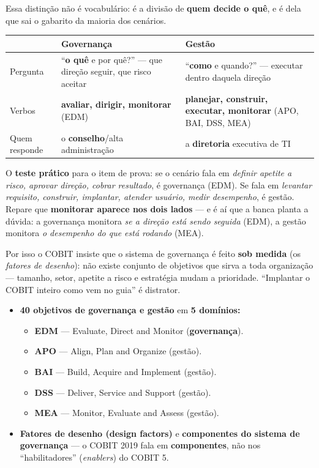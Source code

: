\begin{conceito}
Essa distinção não é vocabulário: é a divisão de \textbf{quem decide o quê},
e é dela que sai o gabarito da maioria dos cenários.

\begin{center}
\begin{tabular}{@{}p{2.4cm}p{4.3cm}p{4.6cm}@{}}
\toprule
& \textbf{Governança} & \textbf{Gestão} \\
\midrule
Pergunta & ``\textbf{o quê} e por quê?'' --- que direção seguir, que risco
aceitar & ``\textbf{como} e quando?'' --- executar dentro daquela direção \\
Verbos & \textbf{avaliar, dirigir, monitorar} (EDM) & \textbf{planejar,
construir, executar, monitorar} (APO, BAI, DSS, MEA) \\
Quem responde & o \textbf{conselho}/alta administração & a \textbf{diretoria}
executiva de TI \\
\bottomrule
\end{tabular}
\end{center}

O \textbf{teste prático} para o item de prova: se o cenário fala em
\emph{definir apetite a risco, aprovar direção, cobrar resultado}, é
governança (EDM). Se fala em \emph{levantar requisito, construir, implantar,
atender usuário, medir desempenho}, é gestão. Repare que \textbf{monitorar
aparece nos dois lados} --- e é aí que a banca planta a dúvida: a governança
monitora \emph{se a direção está sendo seguida} (EDM), a gestão monitora
\emph{o desempenho do que está rodando} (MEA).

Por isso o COBIT insiste que o sistema de governança é feito \textbf{sob
medida} (os \emph{fatores de desenho}): não existe conjunto de objetivos que
sirva a toda organização --- tamanho, setor, apetite a risco e estratégia
mudam a prioridade. ``Implantar o COBIT inteiro como vem no guia'' é distrator.
\end{conceito}

\begin{itemize}
\item \textbf{40 objetivos de governança e gestão} em \textbf{5 domínios:}
\begin{itemize}
\item \textbf{EDM} --- Evaluate, Direct and Monitor (\textbf{governança}).
\item \textbf{APO} --- Align, Plan and Organize (gestão).
\item \textbf{BAI} --- Build, Acquire and Implement (gestão).
\item \textbf{DSS} --- Deliver, Service and Support (gestão).
\item \textbf{MEA} --- Monitor, Evaluate and Assess (gestão).
\end{itemize}
\item \textbf{Fatores de desenho (design factors)} e \textbf{componentes do
sistema de governança} --- o COBIT 2019 fala em \textbf{componentes}, não nos
``habilitadores'' (\emph{enablers}) do COBIT 5.
\end{itemize}

